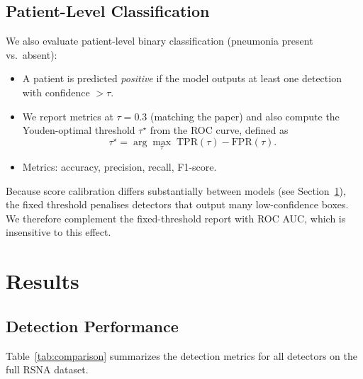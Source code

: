 \documentclass[11pt,a4paper]{article}
\begin{document}
\subsection{Patient-Level Classification}
We also evaluate patient-level binary classification (pneumonia present vs.\ absent):
\begin{itemize}[nosep]
    \item A patient is predicted \emph{positive} if the model outputs at least one detection with confidence $>\tau$.
    \item We report metrics at $\tau = 0.3$ (matching the paper) and also compute the Youden-optimal threshold $\tau^{\star}$ from the ROC curve, defined as
        \begin{equation}
            \tau^{\star} = \arg\max_\tau\; \mathrm{TPR}(\tau) - \mathrm{FPR}(\tau).
        \end{equation}
    \item Metrics: accuracy, precision, recall, F1-score.
\end{itemize}
Because score calibration differs substantially between models (see Section~\ref{sec:results}), the fixed threshold penalises detectors that output many low-confidence boxes. We therefore complement the fixed-threshold report with ROC AUC, which is insensitive to this effect.

\section{Results}
\label{sec:results}

\subsection{Detection Performance}

Table~\ref{tab:comparison} summarizes the detection metrics for all detectors on the full RSNA dataset.
\end{document}
